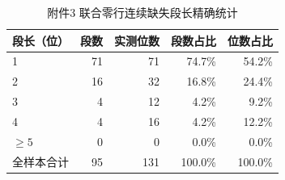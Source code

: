 \begin{table}[htbp]
  \centering\small
  \caption{附件3 联合零行连续缺失段长精确统计}
  \label{tab:dist-fj3-segments}
  \begin{tabularx}{\textwidth}{@{}Xrrrr@{}}
    \toprule
    段长（位） & 段数 & 实测位数 & 段数占比 & 位数占比 \\
    \midrule
    1 & 71  &  71 & 74.7\% & 54.2\% \\
    2 & 16  &  32 & 16.8\% & 24.4\% \\
    3 &  4  &  12 &  4.2\% &  9.2\% \\
    4 &  4  &  16 &  4.2\% & 12.2\% \\
    $\ge 5$ &  0  &   0 &  0.0\% &  0.0\% \\
    \midrule
    全样本合计 & 95 & 131 & 100.0\% & 100.0\% \\
    \bottomrule
  \end{tabularx}
  \par \smallskip
  \end{table}